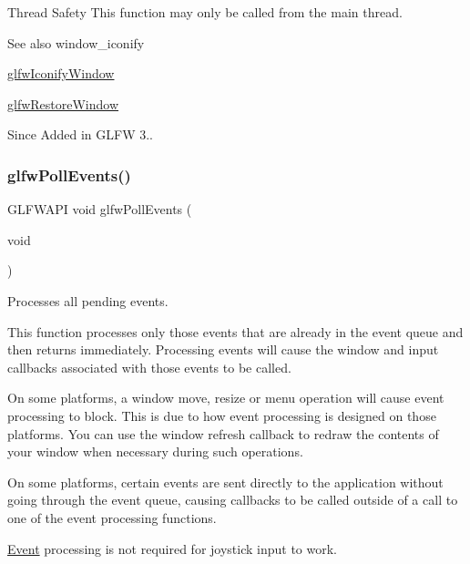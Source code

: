 \begin{DoxyParagraph}{Thread Safety}
This function may only be called from the main thread.
\end{DoxyParagraph}
\begin{DoxySeeAlso}{See also}
window\+\_\+iconify 

\hyperlink{group__window_ga24274e3c6ecd44e11fec5e6b66e4d7f3}{glfw\+Iconify\+Window} 

\hyperlink{group__window_ga1e29caf0b819f578b04db52fff17256c}{glfw\+Restore\+Window}
\end{DoxySeeAlso}
\begin{DoxySince}{Since}
Added in G\+L\+FW 3.. 
\end{DoxySince}
\mbox{\label{group__window_ga872d16e4c77f58c0436f356255920cfc}} 
\subsubsection{\texorpdfstring{glfw\+Poll\+Events()}{glfwPollEvents()}}
{\footnotesize\ttfamily G\+L\+F\+W\+A\+PI void glfw\+Poll\+Events (\begin{DoxyParamCaption}\item[{void}]{ }\end{DoxyParamCaption})}



Processes all pending events. 

This function processes only those events that are already in the event queue and then returns immediately. Processing events will cause the window and input callbacks associated with those events to be called.

On some platforms, a window move, resize or menu operation will cause event processing to block. This is due to how event processing is designed on those platforms. You can use the window refresh callback to redraw the contents of your window when necessary during such operations.

On some platforms, certain events are sent directly to the application without going through the event queue, causing callbacks to be called outside of a call to one of the event processing functions.

\hyperlink{classEvent}{Event} processing is not required for joystick input to work.

